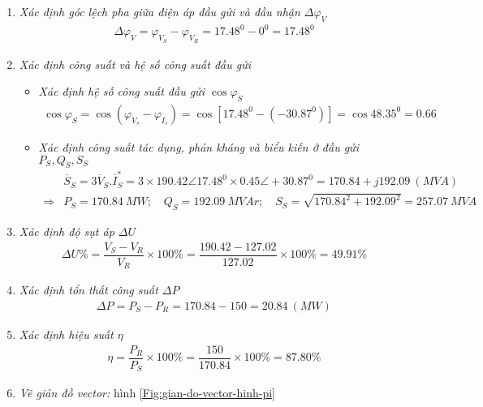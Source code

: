 \documentclass[12pt,a4paper]{article}
\newcommand{\unit}[1]{~#1}
\newcommand{\unitp}[1]{~\left({#1}\right)}
\newcommand{\pfm}[1]{\left({#1}\right)}
\begin{document}
\begin{enumerate}[\it a.]
		\item \emph{Xác định góc lệch pha giữa điện áp đầu gửi và đầu nhận $\Delta \varphi_V$}
			\begin{align*}
				\Delta \varphi_V = \varphi_{V_S} - \varphi_{V_R} = 17.48^0 - 0^0= 17.48^0
			\end{align*}

		\item \emph{Xác định công suất và hệ số công suất đầu gửi}
			\begin{itemize}
				\item \emph{Xác định hệ số công suất đầu gửi $\cos \varphi_S$}
					\begin{align*}
						\cos \varphi_S = \cos \pfm{\varphi_{V_s} - \varphi_{I_{s}}}= \cos \left[{17.48^0 - \pfm{-30.87^0}} \right] = \cos 48.35^0 = 0.66
					\end{align*}

				\item \emph{Xác định công suất tác dụng, phản kháng và biểu kiến ở đầu gửi $P_S, Q_S, S_S$}
					\begin{align*}
						& \overline{S}_S = 3 \overline{V}_S.\overline{I}_S^{\ast} = 3 \times 190.42 \angle 17.48^0 \times 0.45 \angle +30.87^0 = 170.84 + j192.09 \unitp{MVA}\\
						\Longrightarrow & P_S = 170.84 \unit{MW}; \quad Q_S = 192.09 \unit{MVAr}; \quad S_S = \sqrt{170.84^2 + 192.09^2} = 257.07 \unit{MVA}
					\end{align*}
			\end{itemize}

		\item \emph{Xác định độ sụt áp $\Delta U$}
			\begin{align*}
				\Delta U \%= \dfrac{V_S - V_R}{V_R} \times 100 \% = \dfrac{190.42 - 127.02}{127.02} \times 100 \% = 49.91\%
			\end{align*}

		\item \emph{Xác định tổn thất công suất $\Delta P$}
			\begin{align*}
				\Delta P = P_S - P_R = 170.84 - 150 = 20.84 \unitp{MW}
			\end{align*}

		\item \emph{Xác định hiệu suất $\eta$}
			\begin{align*}
				\eta = \dfrac{P_R}{P_S} \times 100 \% = \dfrac{150}{170.84} \times 100\% = 87.80\%
			\end{align*}

		\item \emph{Vẽ giản đồ vector:} hình \ref{Fig:gian-do-vector-hinh-pi}


\end{enumerate}
\end{document}
